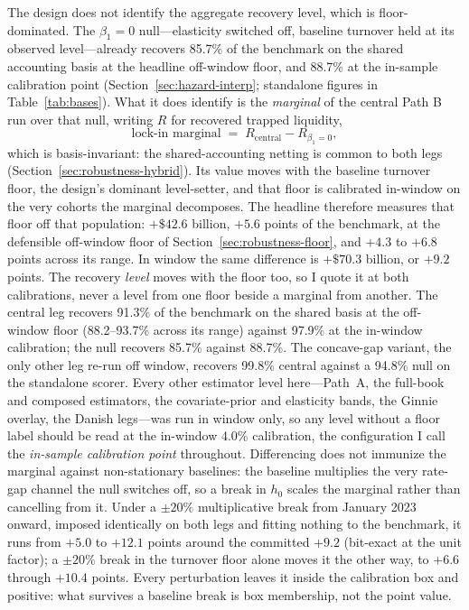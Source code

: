 \documentclass[12pt]{article}
\begin{document}
The design does not identify the aggregate recovery level, which is floor-dominated. The $\beta_1 = 0$ null---elasticity switched off, baseline turnover held at its observed level---already recovers 85.7\% of the benchmark on the shared accounting basis at the headline off-window floor, and 88.7\% at the in-sample calibration point (Section~\ref{sec:hazard-interp}; standalone figures in Table~\ref{tab:bases}). What it does identify is the \emph{marginal} of the central Path B run over that null, writing $R$ for recovered trapped liquidity,
\begin{equation}\label{eq:marginal}
\text{lock-in marginal} \;=\; R_{\text{central}} - R_{\beta_1 = 0},
\end{equation}
which is basis-invariant: the shared-accounting netting is common to both legs (Section~\ref{sec:robustness-hybrid}). Its value moves with the baseline turnover floor, the design's dominant level-setter, and that floor is calibrated in-window on the very cohorts the marginal decomposes. The headline therefore measures that floor off that population: $+\$42.6$ billion, $+5.6$ points of the benchmark, at the defensible off-window floor of Section~\ref{sec:robustness-floor}, and $+4.3$ to $+6.8$ points across its range. In window the same difference is $+\$70.3$ billion, or $+9.2$ points. The recovery \emph{level} moves with the floor too, so I quote it at both calibrations, never a level from one floor beside a marginal from another. The central leg recovers 91.3\% of the benchmark on the shared basis at the off-window floor (88.2--93.7\% across its range) against 97.9\% at the in-window calibration; the null recovers 85.7\% against 88.7\%. The concave-gap variant, the only other leg re-run off window, recovers 99.8\% central against a 94.8\% null on the standalone scorer. Every other estimator level here---Path~A, the full-book and composed estimators, the covariate-prior and elasticity bands, the Ginnie overlay, the Danish legs---was run in window only, so any level without a floor label should be read at the in-window 4.0\% calibration, the configuration I call the \emph{in-sample calibration point} throughout. Differencing does not immunize the marginal against non-stationary baselines: the baseline multiplies the very rate-gap channel the null switches off, so a break in $h_0$ scales the marginal rather than cancelling from it. Under a $\pm 20\%$ multiplicative break from January 2023 onward, imposed identically on both legs and fitting nothing to the benchmark, it runs from $+5.0$ to $+12.1$ points around the committed $+9.2$ (bit-exact at the unit factor); a $\pm 20\%$ break in the turnover floor alone moves it the other way, to $+6.6$ through $+10.4$ points. Every perturbation leaves it inside the calibration box and positive: what survives a baseline break is box membership, not the point value.
\end{document}
